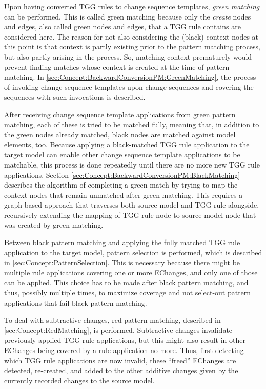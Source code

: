 Upon having converted TGG rules to change sequence templates, \emph{green matching} can be performed. This is called green matching because only the \emph{create} nodes and edges, also called green nodes and edges, that a TGG rule contains are considered here.
The reason for not also considering the (black) context nodes at this point is that context is partly existing prior to the pattern matching process, but also partly arising in the process. So, matching context prematurely would prevent finding matches whose context is created at the time of pattern matching.
In \autoref{sec:Concept:BackwardConversionPM:GreenMatching}, the process of invoking change sequence templates upon change sequences and covering the sequences with such invocations is described.

After receiving change sequence template applications from green pattern matching, each of these is tried to be matched fully, meaning that, in addition to the green nodes already matched, black nodes are matched against model elements, too.
Because applying a black-matched TGG rule application to the target model can enable other change sequence template applications to be matchable, this process is done repeatedly until there are no more new TGG rule applications.
Section \ref{sec:Concept:BackwardConversionPM:BlackMatching} describes the algorithm of completing a green match by trying to map the context nodes that remain unmatched after green matching.
This requires a graph-based approach that traverses both source model and TGG rule alongside, recursively extending the mapping of TGG rule node to source model node that was created by green matching.

Between black pattern matching and applying the fully matched TGG rule application to the target model, pattern selection is performed, which is described in \ref{sec:Concept:PatternSelection}. This is necessary because there might be multiple rule applications covering one or more EChanges, and only one of those can be applied. This choice has to be made after black pattern matching, and thus, possibly multiple times, to maximize coverage and not select-out pattern applications that fail black pattern matching.

To deal with subtractive changes, red pattern matching, described in \autoref{sec:Concept:RedMatching}, is performed.
Subtractive changes invalidate previously applied TGG rule applications, but this might also result in other EChanges being covered by a rule application no more. Thus, first detecting which TGG rule applications are now invalid, these \enquote{freed} EChanges are detected, re-created, and added to the other additive changes given by the currently recorded changes to the source model.

